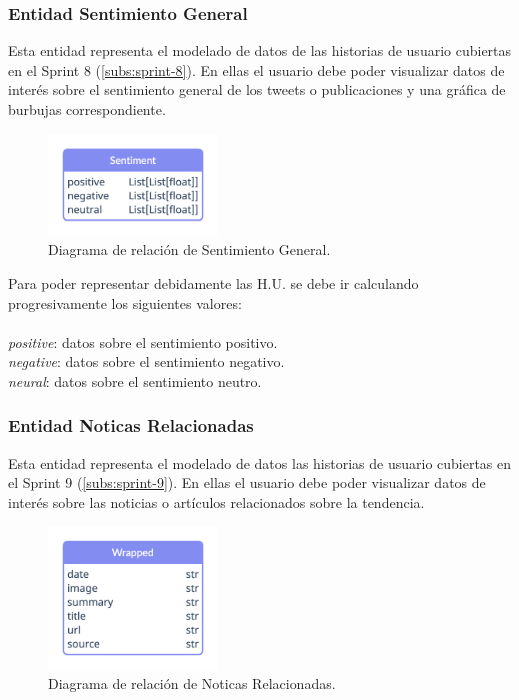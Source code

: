 \subsubsection{Entidad Sentimiento General}\label{subsub:ent-sentiment}
Esta entidad representa el modelado de datos de las historias de usuario cubiertas en el Sprint 8 (\ref{subs:sprint-8}). En ellas el usuario debe poder visualizar datos de interés sobre el sentimiento general de los tweets o publicaciones y una gráfica de burbujas correspondiente.
\begin{figure}[H]
    \centering
    \myfloatalign
    \includegraphics[width=0.4\textwidth]{gfx/diagrama-er3.png}
    \caption[Diagrama de relación de Sentimiento General]{Diagrama de relación de Sentimiento General.}\label{gfx:diagrama-er3}
\end{figure}

Para poder representar debidamente las H.U. se debe ir calculando progresivamente los siguientes valores:
\\\\
\textit{positive}: datos sobre el sentimiento positivo.  \\
\textit{negative}: datos sobre el sentimiento negativo.    \\
\textit{neural}: datos sobre el sentimiento neutro.

\subsubsection{Entidad Noticas Relacionadas}\label{subsub:ent-noticias}
Esta entidad representa el modelado de datos las historias de usuario cubiertas en el Sprint 9 (\ref{subs:sprint-9}). En ellas el usuario debe poder visualizar datos de interés sobre las noticias o artículos relacionados sobre la tendencia.
\begin{figure}[H]
    \centering
    \myfloatalign
    \includegraphics[width=0.4\textwidth]{gfx/diagrama-er4.png}
    \caption[Diagrama de relación de Noticas Relacionadas]{Diagrama de relación de Noticas Relacionadas.}\label{gfx:diagrama-er4}
\end{figure}

